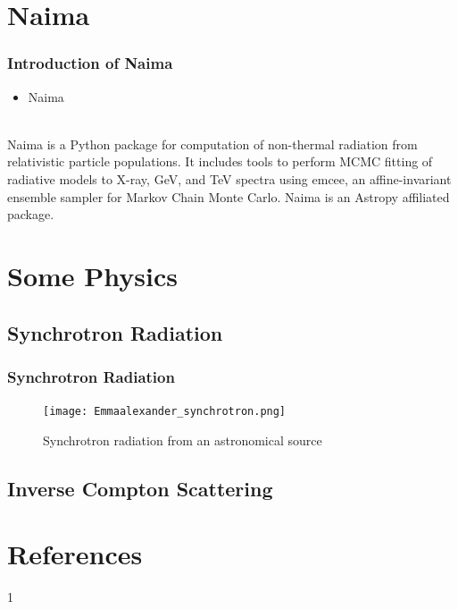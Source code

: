 \documentclass[9pt, mathserif]{beamer}
\begin{document}
    \section{Naima}
        \begin{frame}
            \frametitle{Introduction of Naima}
            \begin{itemize}
                \item \huge{Naima}
            \end{itemize}
            
            \phantom{0}\\

            Naima is a Python package for computation of non-thermal radiation from relativistic particle populations. It includes tools to perform MCMC fitting of radiative models to X-ray, GeV, and TeV spectra using emcee, an affine-invariant ensemble sampler for Markov Chain Monte Carlo. Naima is an Astropy affiliated package.
        \end{frame}

    \section{Some Physics}
        \subsection{Synchrotron Radiation}
            \begin{frame}
                \frametitle{Synchrotron Radiation}
                \begin{figure}[t]
                    \centering
                    \texttt{[image: Emmaalexander\_synchrotron.png]}
                    \caption{Synchrotron radiation from an astronomical source}
                \end{figure}
            \end{frame}
        \subsection{Inverse Compton Scattering}
            \begin{frame}
                
            \end{frame}





    \section{References}
        \begin{frame}
            \begin{thebibliography}{1}
                1
            \end{thebibliography}
        \end{frame}
\end{document}
